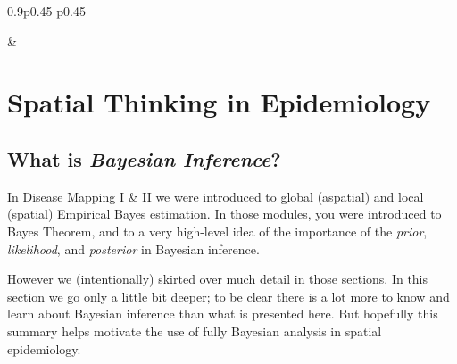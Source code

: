 \documentclass[
]{book}
\begin{document}
\begin{table}[ht]
\begin{centerbox}
\begin{threeparttable}
\begin{tabularx}{0.9\textwidth}{p{} p{}}

 &
 \tabularnewline[-0.5pt]


\end{tabularx}
\end{threeparttable}\par\end{centerbox}

\end{table}
 

\hypertarget{spatial-thinking-in-epidemiology-4}{%
\section{Spatial Thinking in Epidemiology}\label{spatial-thinking-in-epidemiology-4}}

\hypertarget{what-is-bayesian-inference}{%
\subsection{\texorpdfstring{What is \emph{Bayesian Inference}?}{What is Bayesian Inference?}}\label{what-is-bayesian-inference}}

In Disease Mapping I \& II we were introduced to global (aspatial) and local (spatial) Empirical Bayes estimation. In those modules, you were introduced to Bayes Theorem, and to a very high-level idea of the importance of the \emph{prior}, \emph{likelihood}, and \emph{posterior} in Bayesian inference.

However we (intentionally) skirted over much detail in those sections. In this section we go only a little bit deeper; to be clear there is a lot more to know and learn about Bayesian inference than what is presented here. But hopefully this summary helps motivate the use of fully Bayesian analysis in spatial epidemiology.
\end{document}
